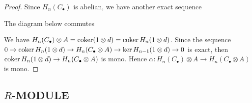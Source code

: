 \documentclass{report}
\begin{document}
\begin{proof}
Since $H_n(C_\bullet)$ is abelian, we have another exact sequence
\begin{center}
\end{center}

The diagram below commutes
\begin{center}
\end{center}

We have $H_n(C_\bullet) \otimes A = \operatorname{coker} (1 \otimes d) = \operatorname{coker} H_n(1 \otimes d)$. Since the sequence $0 \to \operatorname{coker} H_n(1 \otimes d) \to H_n(C_\bullet \otimes A) \to \ker H_{n-1}(1 \otimes d) \to 0$ is exact, then $\operatorname{coker} H_n(1 \otimes d) \to H_n(C_\bullet \otimes A)$ is mono. Hence $\alpha: H_n(C_\bullet) \otimes A \to H_n(C_\bullet \otimes A)$ is mono.
\end{proof}

\subsection{$R$-MODULE}
\end{document}
